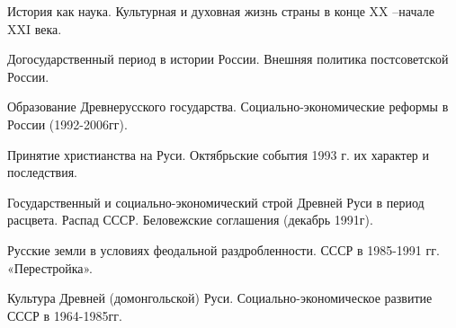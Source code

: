 \documentclass[
	14pt,
	a4paper,
	]
	{scrartcl}
\begin{document}
\shapk
{}
\setcounter{zad}{0}

\vfill
\z 	История как наука.
 \vfill
\z 	Культурная и духовная жизнь страны в конце XX –начале XXI века.
 \vfill

\vfill

\newpage


\shapk
{}
\setcounter{zad}{0}

\vfill
\z 	Догосударственный период в истории России.
 \vfill
\z 	Внешняя политика постсоветской России.
 \vfill

\vfill

\newpage


\shapk
{}
\setcounter{zad}{0}

\vfill
\z 	Образование Древнерусского государства.
 \vfill
\z 	Социально-экономические реформы в России (1992-2006гг).
 \vfill

\vfill

\newpage


\shapk
{}
\setcounter{zad}{0}

\vfill
\z 	Принятие христианства на Руси.
 \vfill
\z 	Октябрьские события 1993 г. их характер и последствия.
 \vfill

\vfill

\newpage


\shapk
{}
\setcounter{zad}{0}

\vfill
\z 	Государственный и социально-экономический строй Древней Руси в период расцвета.
 \vfill
\z 	Распад СССР. Беловежские соглашения (декабрь 1991г).
 \vfill

\vfill

\newpage


\shapk
{}
\setcounter{zad}{0}

\vfill
\z 	Русские земли в условиях феодальной раздробленности.
 \vfill
\z 	СССР в 1985-1991 гг. «Перестройка».
 \vfill

\vfill

\newpage


\shapk
{}
\setcounter{zad}{0}

\vfill
\z 	Культура Древней (домонгольской) Руси.
 \vfill
\z 	Социально-экономическое развитие СССР в 1964-1985гг.
 \vfill

\vfill

\newpage


\shapk
{}
\setcounter{zad}{0}
\end{document}
